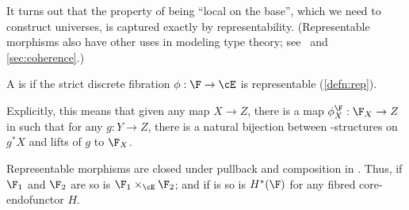 It turns out that the property of being ``local on the base'', which we need to construct universes, is captured exactly by representability.
(Representable morphisms also have other uses in modeling type theory; see~\cite{awodey:natmodels} and \cref{sec:coherence}.)

\begin{defn}\label{defn:local}
  A \nfs \F is \textbf{\local}
  if the strict discrete fibration $\phi:\F\to\cE$ is representable (\cref{defn:rep}).
\end{defn}


Explicitly, this means that given any map $X\to Z$, there is a map $\phi^\F_X : \F_X \to Z$ in \E such that for any $g:Y\to Z$, there is a natural bijection between \F-structures on $g^*X$ and lifts of $g$ to $\F_X$.

\begin{eg}
  Representable morphisms are closed under pullback and composition in \Ehat.
  Thus, if $\F_1$ and $\F_2$ are \local so is $\F_1\times_\cE \F_2$; and if \F is \local so is $H^*(\F)$ for any fibred core-endofunctor $H$.
\end{eg}


